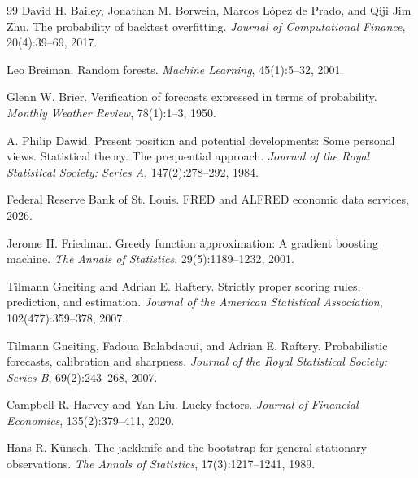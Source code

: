 \documentclass[11pt]{article}
\begin{document}
\begin{thebibliography}{99}
David H. Bailey, Jonathan M. Borwein, Marcos L{\'o}pez de Prado, and Qiji Jim Zhu.
\newblock The probability of backtest overfitting.
\newblock \emph{Journal of Computational Finance}, 20(4):39--69, 2017.

Leo Breiman.
\newblock Random forests.
\newblock \emph{Machine Learning}, 45(1):5--32, 2001.

Glenn W. Brier.
\newblock Verification of forecasts expressed in terms of probability.
\newblock \emph{Monthly Weather Review}, 78(1):1--3, 1950.

A. Philip Dawid.
\newblock Present position and potential developments: Some personal views. Statistical theory. The prequential approach.
\newblock \emph{Journal of the Royal Statistical Society: Series A}, 147(2):278--292, 1984.

Federal Reserve Bank of St. Louis.
\newblock FRED and ALFRED economic data services, 2026.

Jerome H. Friedman.
\newblock Greedy function approximation: A gradient boosting machine.
\newblock \emph{The Annals of Statistics}, 29(5):1189--1232, 2001.

Tilmann Gneiting and Adrian E. Raftery.
\newblock Strictly proper scoring rules, prediction, and estimation.
\newblock \emph{Journal of the American Statistical Association}, 102(477):359--378, 2007.

Tilmann Gneiting, Fadoua Balabdaoui, and Adrian E. Raftery.
\newblock Probabilistic forecasts, calibration and sharpness.
\newblock \emph{Journal of the Royal Statistical Society: Series B}, 69(2):243--268, 2007.

Campbell R. Harvey and Yan Liu.
\newblock Lucky factors.
\newblock \emph{Journal of Financial Economics}, 135(2):379--411, 2020.

Hans R. K{\"u}nsch.
\newblock The jackknife and the bootstrap for general stationary observations.
\newblock \emph{The Annals of Statistics}, 17(3):1217--1241, 1989.


\end{thebibliography}
\end{document}
